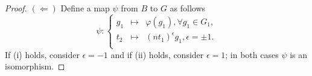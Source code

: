 \documentclass[10pt,a4paper]{amsart}
\begin{document}
\begin{proof}
\bigskip
$(\Longleftarrow)$ Define a map $\psi$  from $B$ to $G$ as follows $$\psi: \left\{
\begin{array}{ccl}
g_1 & \longmapsto  & \varphi(g_1), \forall  g_1 \in  G_1,\\
t_2 & \longmapsto  & (nt_1)^{\epsilon}g_1, \epsilon=\pm 1. \\
\end{array}
\right.$$
If (i) holds, consider $\epsilon=-1$ and if  (ii) holds, consider $\epsilon=1$;  in both cases $\psi$ is an isomorphism.

\end{proof} 
\end{document}
